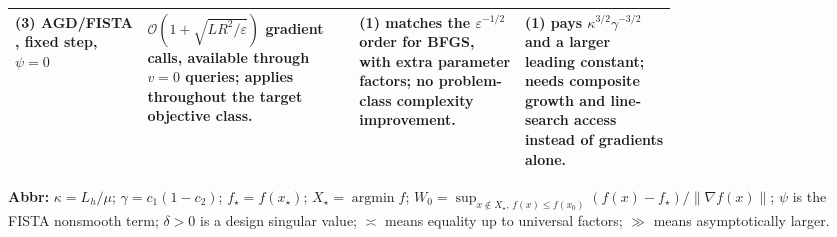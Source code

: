 \begin{table}[tp]
\begin{threeparttable}
\begin{tabularx}{\linewidth}{@{}>{\raggedright\arraybackslash}p{0.20\linewidth}>{\raggedright\arraybackslash}p{0.32\linewidth}>{\raggedright\arraybackslash}p{0.25\linewidth}>{\raggedright\arraybackslash}X@{}}
\midrule
\textbf{(3)} AGD/FISTA \citep[Thm.~4.4]{ifsBeckTeboulle2009}, fixed step, $\psi=0$
& $\mathcal{O}\!\left(1+\sqrt{LR^2/\varepsilon}\right)$ gradient calls, available through $v=0$ queries; applies throughout the target objective class.
& \textbf{(1)} matches the $\varepsilon^{-1/2}$ order for BFGS, with extra parameter factors; no problem-class complexity improvement.
& \textbf{(1)} pays $\kappa^{3/2}\gamma^{-3/2}$ and a larger leading constant; needs composite growth and line-search access instead of gradients alone. \\
\bottomrule
\end{tabularx}
\begin{tablenotes}[flushleft]\footnotesize
\item[] \textbf{Abbr:} $\kappa=L_h/\mu$; $\gamma=c_1(1-c_2)$; $f_\star=f(x_\star)$; $X_\star=\operatorname{argmin} f$; $W_0=\sup_{x\notin X_\star,\,f(x)\le f(x_0)}(f(x)-f_\star)/\|\nabla f(x)\|$; $\psi$ is the FISTA nonsmooth term; $\delta>0$ is a design singular value; $\asymp$ means equality up to universal factors; $\gg$ means asymptotically larger.
\end{tablenotes}
\end{threeparttable}
\end{table}
